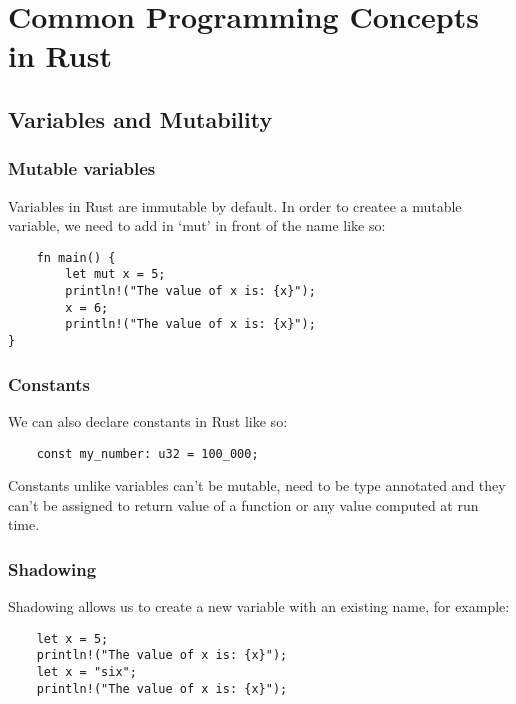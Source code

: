 \section{Common Programming Concepts in Rust}
\subsection{Variables and Mutability}
\subsubsection{Mutable variables} 
Variables in Rust are immutable by default. In order to createe a mutable variable, we need to add in `mut' in front of the name like so:
\begin{lstlisting}
    fn main() {
        let mut x = 5;
        println!("The value of x is: {x}");
        x = 6;
        println!("The value of x is: {x}"); 
}
\end{lstlisting}


\subsubsection{Constants} We can also declare constants in Rust like so:
\begin{lstlisting}
    const my_number: u32 = 100_000;
\end{lstlisting}

Constants unlike variables can't be mutable, need to be type annotated and they can't be assigned to return value of a function or any value computed at run time.

\subsubsection{Shadowing}
Shadowing allows us to create a new variable with an existing name, for example:
\begin{lstlisting}
    let x = 5;
    println!("The value of x is: {x}");
    let x = "six";
    println!("The value of x is: {x}");
\end{lstlisting}


